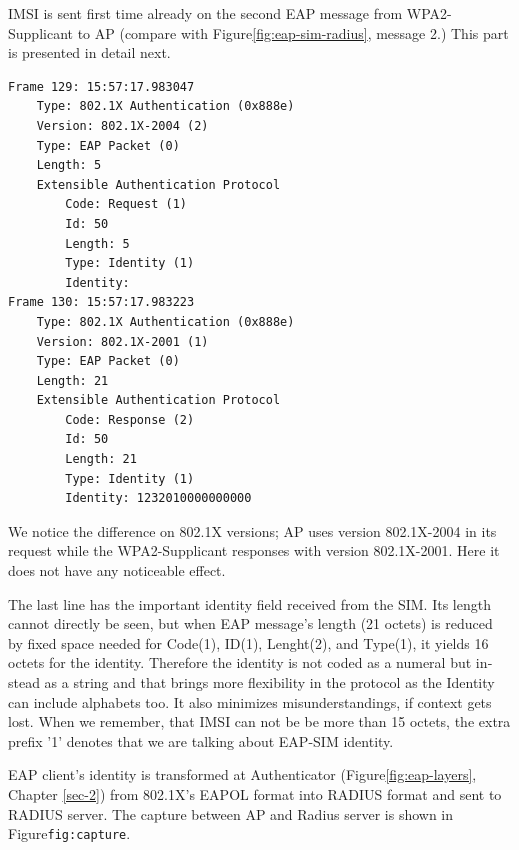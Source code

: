 \documentclass[12pt,a4paper,english]{tutthesis}
\begin{document}
\begin{otherlanguage}{english}
IMSI is sent first time already on the second EAP message from 
WPA2-Supplicant to AP (compare with Figure\ref{fig:eap-sim-radius}, message 2.)
This part is presented in detail next.

\scriptsize
\begin{verbatim}
Frame 129: 15:57:17.983047
    Type: 802.1X Authentication (0x888e)
    Version: 802.1X-2004 (2)
    Type: EAP Packet (0)
    Length: 5
    Extensible Authentication Protocol
        Code: Request (1)
        Id: 50
        Length: 5
        Type: Identity (1)
        Identity: 
Frame 130: 15:57:17.983223
    Type: 802.1X Authentication (0x888e)
    Version: 802.1X-2001 (1)
    Type: EAP Packet (0)
    Length: 21
    Extensible Authentication Protocol
        Code: Response (2)
        Id: 50
        Length: 21
        Type: Identity (1)
        Identity: 1232010000000000
\end{verbatim}
\normalsize

We notice the difference on 802.1X versions; AP uses version
802.1X-2004 in its request while the WPA2-Supplicant
responses with version 802.1X-2001. Here it does not have any
noticeable effect. 

The last line has the important identity field received from the SIM.
Its length cannot directly be seen, but when EAP message's length (21
octets) is reduced by fixed space needed for Code(1), ID(1),
Lenght(2), and Type(1), it yields 16 octets for the
identity. Therefore the identity is not coded as a 
numeral but instead as a string and that brings more flexibility in
the protocol as the Identity can include alphabets too. It also
minimizes misunderstandings, if context gets lost. 
When we remember, that IMSI can not be be more than 15 octets, the extra prefix '1'
denotes that we are talking about EAP-SIM identity. 





EAP client's identity is transformed at Authenticator
(Figure\ref{fig:eap-layers}, Chapter \ref{sec-2}) from 802.1X's 
EAPOL format  into RADIUS format and
sent to RADIUS server. The capture between AP and Radius server is
shown
in Figure\texttt{fig:capture}.






\end{otherlanguage}
\end{document}
